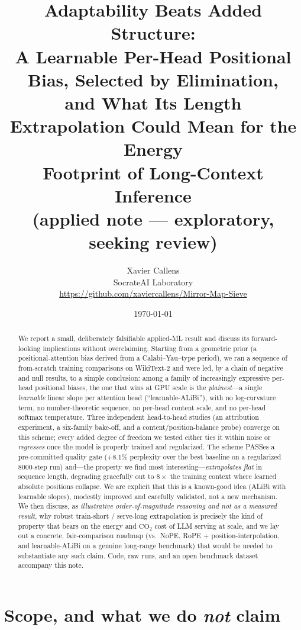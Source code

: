 \documentclass[11pt,a4paper]{article}
\title{Adaptability Beats Added Structure:\\
  A Learnable Per-Head Positional Bias, Selected by Elimination,\\
  and What Its Length Extrapolation Could Mean for the Energy\\
  Footprint of Long-Context Inference\\
  \large (applied note --- exploratory, seeking review)}
\author{Xavier Callens\\
  SocrateAI Laboratory\\
  \url{https://github.com/xaviercallens/Mirror-Map-Sieve}}
\date{\today}
\begin{document}
\maketitle

\begin{abstract}
We report a small, deliberately falsifiable applied-ML result and discuss its
forward-looking implications without overclaiming. Starting from a geometric
prior (a positional-attention bias derived from a Calabi--Yau--type period), we
ran a sequence of from-scratch training comparisons on WikiText-2 and were led,
by a chain of negative and null results, to a simple conclusion: among a family
of increasingly expressive per-head positional biases, the one that wins at GPU
scale is the \emph{plainest}---a single \emph{learnable} linear slope per
attention head (``learnable-ALiBi''), with no log-curvature term, no
number-theoretic sequence, no per-head content scale, and no per-head softmax
temperature. Three independent head-to-head studies (an attribution experiment,
a six-family bake-off, and a content/position-balance probe) converge on this
scheme; every added degree of freedom we tested either ties it within noise or
\emph{regresses} once the model is properly trained and regularized. The scheme
PASSes a pre-committed quality gate ($+8.1\%$ perplexity over the best baseline
on a regularized $8000$-step run) and---the property we find most
interesting---\emph{extrapolates flat} in sequence length, degrading gracefully
out to $8\times$ the training context where learned absolute positions collapse.
We are explicit that this is a known-good idea (ALiBi with learnable slopes),
modestly improved and carefully validated, not a new mechanism. We then discuss,
as \emph{illustrative order-of-magnitude reasoning and not as a measured
result}, why robust train-short / serve-long extrapolation is precisely the kind
of property that bears on the energy and $\mathrm{CO_2}$ cost of LLM serving at
scale, and we lay out a concrete, fair-comparison roadmap (vs.\ NoPE, RoPE +
position-interpolation, and learnable-ALiBi on a genuine long-range benchmark)
that would be needed to substantiate any such claim. Code, raw runs, and an open
benchmark dataset accompany this note.
\end{abstract}

\tableofcontents

\section{Scope, and what we do \emph{not} claim}
\label{sec:scope}
\end{document}
